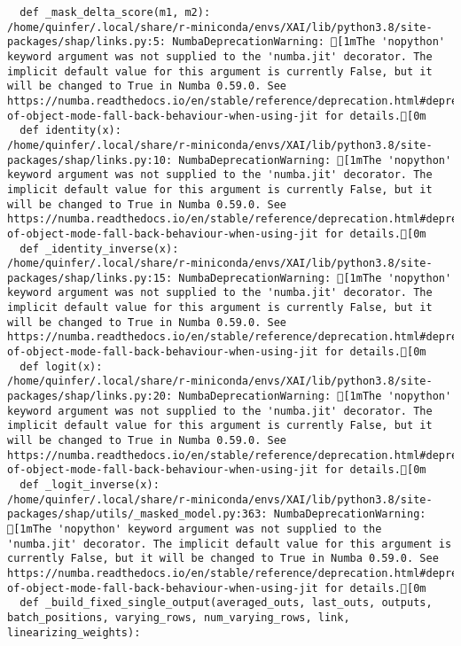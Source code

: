 \documentclass[
  letterpaper,
  DIV=11,
  numbers=noendperiod]{scrartcl}
\begin{document}
\begin{verbatim}
  def _mask_delta_score(m1, m2):
/home/quinfer/.local/share/r-miniconda/envs/XAI/lib/python3.8/site-packages/shap/links.py:5: NumbaDeprecationWarning: [1mThe 'nopython' keyword argument was not supplied to the 'numba.jit' decorator. The implicit default value for this argument is currently False, but it will be changed to True in Numba 0.59.0. See https://numba.readthedocs.io/en/stable/reference/deprecation.html#deprecation-of-object-mode-fall-back-behaviour-when-using-jit for details.[0m
  def identity(x):
/home/quinfer/.local/share/r-miniconda/envs/XAI/lib/python3.8/site-packages/shap/links.py:10: NumbaDeprecationWarning: [1mThe 'nopython' keyword argument was not supplied to the 'numba.jit' decorator. The implicit default value for this argument is currently False, but it will be changed to True in Numba 0.59.0. See https://numba.readthedocs.io/en/stable/reference/deprecation.html#deprecation-of-object-mode-fall-back-behaviour-when-using-jit for details.[0m
  def _identity_inverse(x):
/home/quinfer/.local/share/r-miniconda/envs/XAI/lib/python3.8/site-packages/shap/links.py:15: NumbaDeprecationWarning: [1mThe 'nopython' keyword argument was not supplied to the 'numba.jit' decorator. The implicit default value for this argument is currently False, but it will be changed to True in Numba 0.59.0. See https://numba.readthedocs.io/en/stable/reference/deprecation.html#deprecation-of-object-mode-fall-back-behaviour-when-using-jit for details.[0m
  def logit(x):
/home/quinfer/.local/share/r-miniconda/envs/XAI/lib/python3.8/site-packages/shap/links.py:20: NumbaDeprecationWarning: [1mThe 'nopython' keyword argument was not supplied to the 'numba.jit' decorator. The implicit default value for this argument is currently False, but it will be changed to True in Numba 0.59.0. See https://numba.readthedocs.io/en/stable/reference/deprecation.html#deprecation-of-object-mode-fall-back-behaviour-when-using-jit for details.[0m
  def _logit_inverse(x):
/home/quinfer/.local/share/r-miniconda/envs/XAI/lib/python3.8/site-packages/shap/utils/_masked_model.py:363: NumbaDeprecationWarning: [1mThe 'nopython' keyword argument was not supplied to the 'numba.jit' decorator. The implicit default value for this argument is currently False, but it will be changed to True in Numba 0.59.0. See https://numba.readthedocs.io/en/stable/reference/deprecation.html#deprecation-of-object-mode-fall-back-behaviour-when-using-jit for details.[0m
  def _build_fixed_single_output(averaged_outs, last_outs, outputs, batch_positions, varying_rows, num_varying_rows, link, linearizing_weights):

\end{verbatim}
\end{document}
